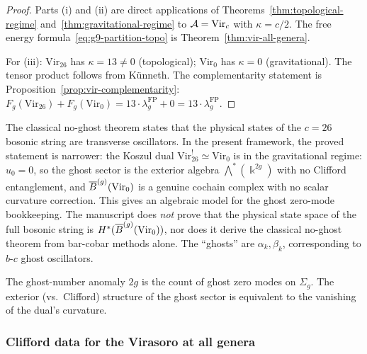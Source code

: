 \begin{proof}
Parts (i) and (ii) are direct applications of
Theorems~\ref{thm:topological-regime}
and~\ref{thm:gravitational-regime} to $\mathcal{A} = \mathrm{Vir}_c$ with
$\kappa = c/2$. The free energy
formula~\eqref{eq:g9-partition-topo} is Theorem~\ref{thm:vir-all-genera}.

For (iii): $\mathrm{Vir}_{26}$ has $\kappa = 13 \neq 0$
(topological); $\mathrm{Vir}_0$ has $\kappa = 0$ (gravitational).
The tensor product follows from K\"unneth. The
complementarity statement is
Proposition~\ref{prop:vir-complementarity}: $F_g(\mathrm{Vir}_{26}) +
F_g(\mathrm{Vir}_0) = 13 \cdot \lambda_g^{\mathrm{FP}} + 0 =
13 \cdot \lambda_g^{\mathrm{FP}}$.
\end{proof}

\begin{remark}
\label{rem:g9-no-ghost}
The classical no-ghost theorem states that the physical states of the
$c = 26$ bosonic string are transverse oscillators. In the present
framework, the proved statement is narrower: the Koszul dual
$\mathrm{Vir}_{26}^! \simeq \mathrm{Vir}_0$ is in the gravitational
regime: $u_0 = 0$, so the ghost sector is the exterior algebra
$\bigwedge^*(\Bbbk^{2g})$ with no Clifford entanglement, and
$\overline{B}^{(g)}(\mathrm{Vir}_0)$ is a genuine cochain complex with no
scalar curvature correction. This gives an algebraic model for the
ghost zero-mode bookkeeping. The manuscript does \emph{not} prove that
the physical state space of the full bosonic string is
$H^*(\overline{B}^{(g)}(\mathrm{Vir}_0))$, nor does it derive the classical
no-ghost theorem from bar-cobar methods alone. The ``ghosts'' are
$\alpha_k, \beta_k$, corresponding to $b$-$c$ ghost oscillators.

The ghost-number anomaly $2g$ is the count of ghost zero modes
on $\Sigma_g$. The exterior (vs.\ Clifford) structure of the ghost
sector is equivalent to the vanishing of the dual's curvature.
\end{remark}

\subsubsection{Clifford data for the Virasoro at all genera}
\label{subsubsec:vir-clifford-data}


